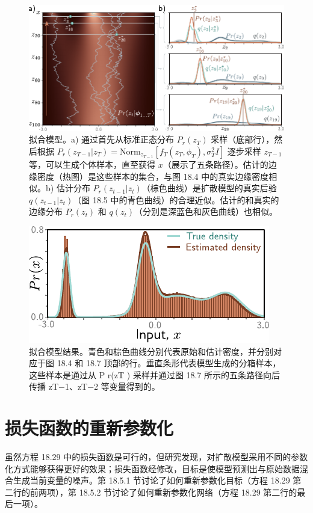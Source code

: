 \documentclass[lang=cn,newtx,10pt,scheme=chinese]{elegantbook}
\begin{document}
\begin{figure}[ht!]
\centering
\includegraphics[width=0.7\linewidth]{PDFFigures/UDLChap18PDF/DiffusionPredict.pdf}
\caption{拟合模型。a) 通过首先从标准正态分布 \( P_r(z_T) \) 采样（底部行），然后根据 \( P_r(z_{T-1} | z_T) = \text{Norm}_{z_{T-1}}[f_T(z_T, \phi_T), \sigma_T^2 I] \) 逐步采样 \( z_{T-1} \) 等，可以生成个体样本，直至获得 \( x \)（展示了五条路径）。估计的边缘密度（热图）是这些样本的集合，与图 18.4 中的真实边缘密度相似。b) 估计分布 \( P_r(z_{t-1} | z_t) \)（棕色曲线）是扩散模型的真实后验 \( q(z_{t-1} | z_t) \)（图 18.5 中的青色曲线）的合理近似。估计的和真实的边缘分布 \( P_r(z_t) \) 和 \( q(z_t) \)（分别是深蓝色和灰色曲线）也相似。}
\end{figure}


\begin{figure}[ht!]
\centering
\includegraphics[width=0.7\linewidth]{PDFFigures/UDLChap18PDF/DiffusionResultsFinal.pdf}
\caption{拟合模型结果。青色和棕色曲线分别代表原始和估计密度，并分别对应于图 18.4 和 18.7 顶部的行。垂直条形代表模型生成的分箱样本，这些样本是通过从 P r(zT ) 采样并通过图 18.7 所示的五条路径向后传播 zT−1、zT−2 等变量得到的。}
\end{figure}


\section{损失函数的重新参数化}
虽然方程 18.29 中的损失函数是可行的，但研究发现，对扩散模型采用不同的参数化方式能够获得更好的效果；损失函数经修改，目标是使模型预测出与原始数据混合生成当前变量的噪声。第 18.5.1 节讨论了如何重新参数化目标（方程 18.29 第二行的前两项），第 18.5.2 节讨论了如何重新参数化网络（方程 18.29 第二行的最后一项）。
\end{document}
